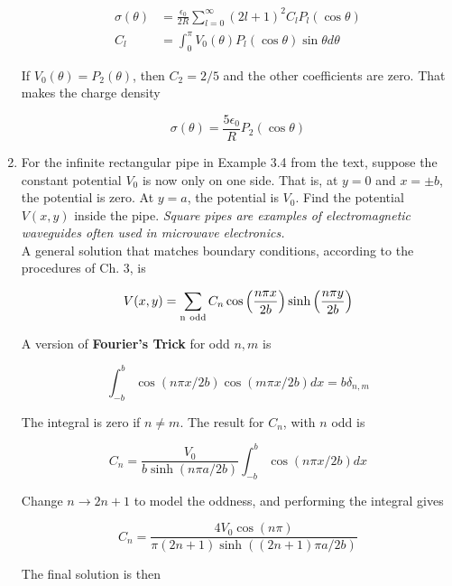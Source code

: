 \documentclass[10pt]{article}
\begin{document}
\begin{enumerate}
\begin{align}
\sigma(\theta) &= \frac{\epsilon_0}{2R} \sum_{l=0}^{\infty} (2l+1)^2 C_l P_l(\cos\theta) \\
C_l &= \int_0^{\pi} V_0(\theta) P_l (\cos\theta) \sin\theta d\theta
\end{align}

If $V_0(\theta) = P_2(\theta)$, then $C_2 = 2/5$ and the other coefficients are zero.  That makes the charge density

\begin{equation}
\sigma(\theta) = \frac{5\epsilon_0}{R} P_2(\cos\theta)
\end{equation}

\item For the infinite rectangular pipe in Example 3.4 from the text, suppose the constant potential $V_0$ is now only on one side.  That is, at $y=0$ and $x=\pm b$, the potential is zero.  At $y=a$, the potential is $V_0$.  Find the potential $V(x,y)$ inside the pipe.  \textit{Square pipes are examples of electromagnetic waveguides often used in microwave electronics.} \\

A general solution that matches boundary conditions, according to the procedures of Ch. 3, is 

\begin{equation}
V(x,y) = \sum_{\rm n ~ odd} C_n \cos\left( \frac{n\pi x}{2b}\right) \sinh\left(\frac{n\pi y}{2b}\right)
\end{equation}

A version of \textbf{Fourier's Trick} for odd $n,m$ is

\begin{equation}
\int_{-b}^{b} \cos(n\pi x/2b) \cos(m\pi x/2b) dx = b\delta_{n,m}
\end{equation}

The integral is zero if $n\neq m$.  The result for $C_n$, with $n$ odd is

\begin{equation}
C_n = \frac{V_0}{b \sinh(n\pi a/2b)} \int_{-b}^{b} \cos(n\pi x/2b) dx
\end{equation}

Change $n \to 2n+1$ to model the oddness, and performing the integral gives

\begin{equation}
C_n = \frac{4V_0\cos(n\pi)}{\pi(2n+1)\sinh((2n+1)\pi a/2b)}
\end{equation}

The final solution is then


\end{enumerate}
\end{document}

